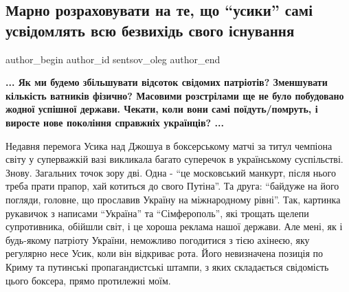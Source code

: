  
 
 
 
 
 
\subsection{Марно розраховувати на те, що \enquote{усики} самі усвідомлять всю безвихідь свого існування}
\label{sec:27_09_2021.fb.sentsov_oleg.1.usik}
 
\ifcmt
 author_begin
   author_id sentsov_oleg
 author_end
\fi


\begin{center}
\begin{fminipage}{0.9\textwidth}
\large\color{orange}\bfseries
...
Як ми будемо збільшувати відсоток свідомих патріотів? Зменшувати кількість
ватників фізично? Масовими розстрілами ще не було побудовано жодної успішної
держави. Чекати, коли вони самі поїдуть/помруть, і виросте нове покоління
справжніх українців?
...
\end{fminipage}
\end{center}

Недавня перемога Усика над Джошуа в боксерському матчі за титул чемпіона світу
у суперважкій вазі викликала багато суперечок в українському суспільстві.
Знову. Загальних точок зору дві. Одна - \enquote{це московський манкурт, після нього
треба прати прапор, хай котиться до свого Путіна}. Та друга: \enquote{байдуже на його
погляди, головне, що прославив Україну на міжнародному рівні}. Так, картинка
рукавичок з написами \enquote{Україна} та \enquote{Сімферополь}, які трощать щелепи
супротивника, обійшли світ, і це хороша реклама нашої держави. Але мені, як і
будь-якому патріоту України, неможливо погодитися з тією ахінеєю, яку регулярно
несе Усик, коли він відкриває рота. Його невизначена позиція по Криму та
путинські пропагандистські штампи, з яких складається свідомість цього боксера,
прямо протилежні моїм. 

